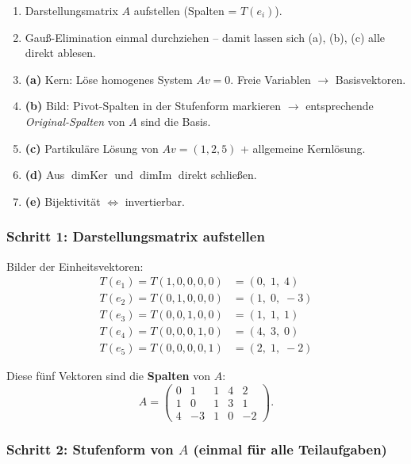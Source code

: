 \documentclass[a4paper,12pt]{article}
\begin{document}
\begin{wastun}
\begin{enumerate}[leftmargin=*, nosep]
    \item Darstellungsmatrix $A$ aufstellen (Spalten = $T(e_i)$).
    \item Gau\ss-Elimination einmal durchziehen -- damit lassen sich (a), (b), (c) alle direkt ablesen.
    \item \textbf{(a)} Kern: L\"ose homogenes System $Av = 0$. Freie Variablen $\to$ Basisvektoren.
    \item \textbf{(b)} Bild: Pivot-Spalten in der Stufenform markieren $\to$ entsprechende \emph{Original-Spalten} von $A$ sind die Basis.
    \item \textbf{(c)} Partikul\"are L\"osung von $Av = (1,2,5)$ + allgemeine Kernl\"osung.
    \item \textbf{(d)} Aus $\dim \text{Ker}$ und $\dim \text{Im}$ direkt schlie\ss en.
    \item \textbf{(e)} Bijektivit\"at $\iff$ invertierbar.
\end{enumerate}
\end{wastun}

\subsubsection*{Schritt 1: Darstellungsmatrix aufstellen}

Bilder der Einheitsvektoren:
\begin{align*}
T(e_1) = T(1,0,0,0,0) &= (0,\; 1,\; 4) \\
T(e_2) = T(0,1,0,0,0) &= (1,\; 0,\; -3) \\
T(e_3) = T(0,0,1,0,0) &= (1,\; 1,\; 1) \\
T(e_4) = T(0,0,0,1,0) &= (4,\; 3,\; 0) \\
T(e_5) = T(0,0,0,0,1) &= (2,\; 1,\; -2)
\end{align*}

Diese f\"unf Vektoren sind die \textbf{Spalten} von $A$:
\[
A = \begin{pmatrix} 0 & 1 & 1 & 4 & 2 \\ 1 & 0 & 1 & 3 & 1 \\ 4 & -3 & 1 & 0 & -2 \end{pmatrix}.
\]

\subsubsection*{Schritt 2: Stufenform von $A$ (einmal f\"ur alle Teilaufgaben)}
\end{document}

